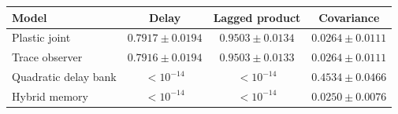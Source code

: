 \begin{tabular}{lccc}\toprule
Model & Delay & Lagged product & Covariance \\\midrule
Plastic joint & $0.7917\pm0.0194$ & $0.9503\pm0.0134$ & $0.0264\pm0.0111$ \\
Trace observer & $0.7916\pm0.0194$ & $0.9503\pm0.0133$ & $0.0264\pm0.0111$ \\
Quadratic delay bank & $<10^{-14}$ & $<10^{-14}$ & $0.4534\pm0.0466$ \\
Hybrid memory & $<10^{-14}$ & $<10^{-14}$ & $0.0250\pm0.0076$ \\
\bottomrule\end{tabular}
